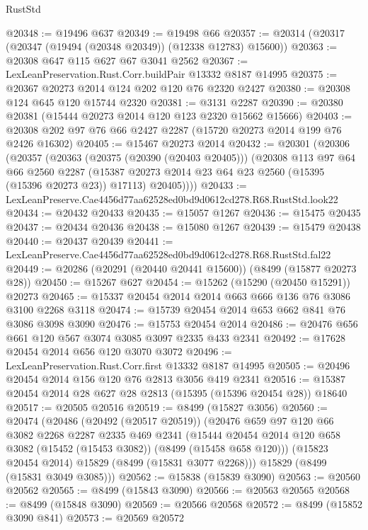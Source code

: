 \begin{lexlean}{RustStd}
\begin{coremodule}
@20348 := @19496 @637
@20349 := @19498 @66
@20357 := @20314 (@20317 (@20347 (@19494 (@20348 @20349)) (@12338 @12783) @15600))
@20363 := @20308 @647 @115 @627 @67 @3041 @2562
@20367 := LexLeanPreservation.Rust.Corr.buildPair @13332 @8187 @14995
@20375 := @20367 @20273 @2014 @124 @202 @120 @76 @2320 @2427
@20380 := @20308 @124 @645 @120 @15744 @2320
@20381 := @3131 @2287
@20390 := @20380 @20381 (@15444 @20273 @2014 @120 @123 @2320 @15662 @15666)
@20403 := @20308 @202 @97 @76 @66 @2427 @2287 (@15720 @20273 @2014 @199 @76 @2426 @16302)
@20405 := @15467 @20273 @2014
@20432 := @20301
    (@20306
      (@20357
        (@20363
          (@20375 (@20390 (@20403 @20405)))
          (@20308
            @113
            @97
            @64
            @66
            @2560
            @2287
            (@15387 @20273 @2014 @23 @64 @23 @2560 (@15395 (@15396 @20273 @23)) @17113)
            @20405))))
@20433 := LexLeanPreserve.Cae4456d77aa62528ed0bd9d0612cd278.R68.RustStd.look22
@20434 := @20432 @20433
@20435 := @15057 @1267
@20436 := @15475 @20435
@20437 := @20434 @20436
@20438 := @15080 @1267
@20439 := @15479 @20438
@20440 := @20437 @20439
@20441 := LexLeanPreserve.Cae4456d77aa62528ed0bd9d0612cd278.R68.RustStd.fal22
@20449 := @20286 (@20291 (@20440 @20441 @15600)) (@8499 (@15877 @20273 @28))
@20450 := @15267 @627
@20454 := @15262 (@15290 (@20450 @15291)) @20273
@20465 := @15337 @20454 @2014 @2014 @663 @666 @136 @76 @3086 @3100 @2268 @3118
@20474 := @15739 @20454 @2014 @653 @662 @841 @76 @3086 @3098 @3090
@20476 := @15753 @20454 @2014
@20486 := @20476 @656 @661 @120 @567 @3074 @3085 @3097 @2335 @433 @2341
@20492 := @17628 @20454 @2014 @656 @120 @3070 @3072
@20496 := LexLeanPreservation.Rust.Corr.first @13332 @8187 @14995
@20505 := @20496 @20454 @2014 @156 @120 @76 @2813 @3056 @419 @2341
@20516 := @15387 @20454 @2014 @28 @627 @28 @2813 (@15395 (@15396 @20454 @28)) @18640
@20517 := @20505 @20516
@20519 := @8499 (@15827 @3056)
@20560 := @20474
    (@20486
      (@20492 (@20517 @20519))
      (@20476
        @659
        @97
        @120
        @66
        @3082
        @2268
        @2287
        @2335
        @469
        @2341
        (@15444 @20454 @2014 @120 @658 @3082 (@15452 (@15453 @3082)) (@8499 (@15458 @658 @120)))
        (@15823 @20454 @2014)
        @15829
        (@8499 (@15831 @3077 @2268)))
      @15829
      (@8499 (@15831 @3049 @3085)))
@20562 := @15838 (@15839 @3090)
@20563 := @20560 @20562
@20565 := @8499 (@15843 @3090)
@20566 := @20563 @20565
@20568 := @8499 (@15848 @3090)
@20569 := @20566 @20568
@20572 := @8499 (@15852 @3090 @841)
@20573 := @20569 @20572

\end{coremodule}
\end{lexlean}
